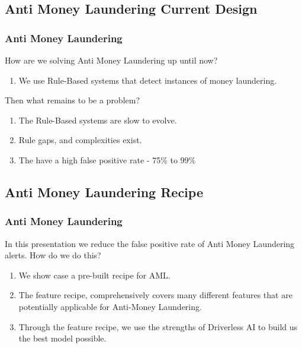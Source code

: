 \documentclass[11pt,
               aspectratio=169,
               hyperref={colorlinks}
               ]{beamer}
\begin{document}
	\subsection{Anti Money Laundering Current Design}
	\begin{frame}
		\frametitle{Anti Money Laundering}
		How are we solving Anti Money Laundering up until now?\\
		\begin{enumerate}
			\item We use Rule-Based systems that detect instances of money laundering.
		\end{enumerate}

		Then what remains to be a problem?\\
		\begin{enumerate}
			\item The Rule-Based systems are slow to evolve. 
			\item Rule gaps, and complexities exist. 
			\item The have a high false positive rate - 75\% to 99\%
		\end{enumerate}
	\end{frame}

		\subsection{Anti Money Laundering Recipe}
	\begin{frame}
		\frametitle{Anti Money Laundering}
		In this presentation we reduce the false positive rate of Anti Money Laundering alerts. How do we do this? \\

		\begin{enumerate}
			\item We show case a pre-built recipe for AML. 
			\item The feature recipe, comprehensively covers many different features that are potentially applicable for Anti-Money Laundering. 
			\item Through the feature recipe, we use the strengths of Driverless AI to build us the best model possible. 
		\end{enumerate}
	\end{frame}
\end{document}
